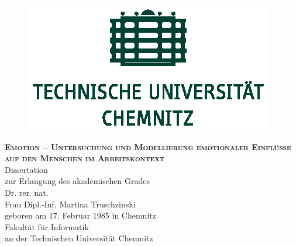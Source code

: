 \documentclass[11pt]{book}
\begin{document}
\begin{titlepage}
\begin{center}


\begin{figure}[h]
\begin{center}
\includegraphics{TU_Chemnitz_positiv_gruen.eps}
\end{center}
\end{figure}

\vspace{3em}

\textsc{\large \textbf{Emotion – Untersuchung und Modellierung emotionaler Einflüsse auf den
Menschen im Arbeitskontext}}\\[4em]

\textnormal{Dissertation}\\

\textnormal{zur Erlangung des akademischen Grades}\\[2em]

\textnormal{Dr. rer. nat.}\\[2em]


\textnormal{Frau Dipl.-Inf. Martina Truschzinski}\\

\textnormal{geboren am 17. Februar 1985 in Chemnitz}\\[3em]

\textnormal{Fakultät für Informatik}\\
\textnormal{an der Technischen Universität Chemnitz}

\end{center}

\vspace*{\fill}


\end{titlepage}


\end{document}
